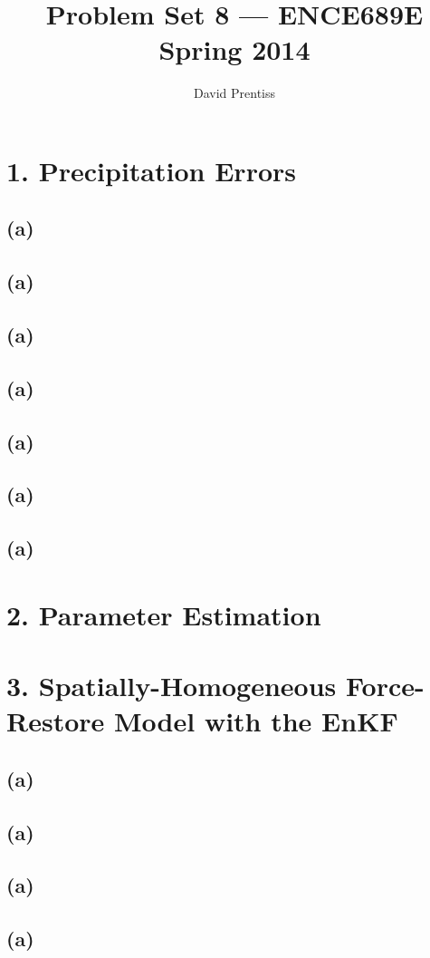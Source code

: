 \documentclass[letterpaper]{tufte-handout}
\title{Problem Set 8 --- ENCE689E Spring 2014}
\author{David Prentiss}
\begin{document}
\maketitle

\section{1. Precipitation Errors}
\subsection{(a)}
\subsection{(a)}
\subsection{(a)}
\subsection{(a)}
\subsection{(a)}
\subsection{(a)}
\subsection{(a)}
\section{2. Parameter Estimation}
\section{3. Spatially-Homogeneous Force-Restore Model with the EnKF}
\subsection{(a)}
\subsection{(a)}
\subsection{(a)}
\subsection{(a)}
\end{document}
